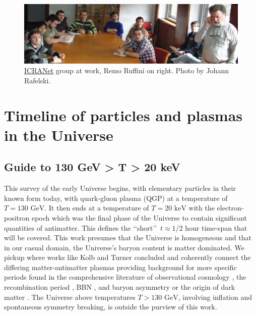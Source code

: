 \documentclass[universe,article,submit,moreauthors,pdftex,a4paper]{Definitions/mdpi}
\newcommand{\GeV}{\text{ GeV}}
\newcommand{\keV}{\text{ keV}}
\begin{document}

\begin{figure}[ht]
  \centering  \includegraphics[width=\textwidth]{./plots/12MarchRemoAtWorkC.jpg}
  \caption{\href{https://www.icranet.org/}{ICRANet} group at work, Remo Ruffini on right. Photo by Johann Rafelski. \label{RemoAtWork}}
\end{figure}

\tableofcontents

\section{Timeline of particles and plasmas in the Universe}\label{sec:Intro}
\subsection{Guide to 130 GeV > T > 20 keV}\label{sec:Guide}
\noindent This survey of the early Universe begins, with elementary particles in their known form today, with quark-gluon plasma (QGP) at a temperature of $T=130\GeV$. It then ends at a temperature of $T=20\keV$ with the electron-positron epoch which was the final phase of the Universe to contain significant quantities of antimatter. This defines the \lq\lq short\rq\rq\ $t\approx1/2$ hour time-span that will be covered. This work presumes that the Universe is homogeneous and that in our casual domain, the Universe's baryon content is matter dominated. We pickup where works like Kolb and Turner \cite{kolb1981early} concluded and coherently connect the differing matter-antimatter plasmas providing background for more specific periods found in the comprehensive literature of observational cosmology \cite{Davis:1985rj,Navarro:1995iw,Moore:1999nt,Springel:2005nw,Demianski:2015xye,Arbey:2021gdg}, the recombination period \cite{Planck:2018vyg,Planck:2018nkj}, BBN \cite{Steigman:2007xt,Cyburt:2015mya,Pitrou:2018cgg}, and baryon asymmetry \cite{Kuzmin:1985mm,Canetti:2012zc,ParticleDataGroup:2022pth} or the origin of dark matter \cite{Bertone:2004pz,Peccei:2006as,Wantz:2009it}. The Universe above temperatures $T>130 \GeV$, involving inflation \cite{Baumann:2009ds,Allahverdi:2020bys} and spontaneous symmetry breaking, is outside the purview of this work.
\end{document}
